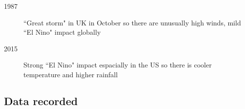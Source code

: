 \begin{description}
	\item[1987] ``Great storm" in UK in October so there are unusually high winds, mild ``El Nino" impact globally
	\item[2015] Strong ``El Nino" impact espacially in the US so there is cooler temperature and higher rainfall
\end{description}

\subsection{Data recorded}
